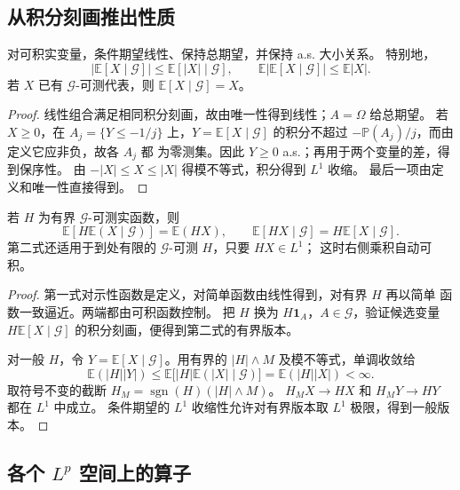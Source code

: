 \subsection{从积分刻画推出性质}

\begin{proposition}
\label{prop:conditional-basic-properties}
对可积实变量，条件期望线性、保持总期望，并保持 a.s. 大小关系。
特别地，
\[
 |\mathbb E[X\mid\mathcal G]|
 \le\mathbb E[|X|\mid\mathcal G],\qquad
 \mathbb E|\mathbb E[X\mid\mathcal G]|\le\mathbb E|X|.
\]
若 $X$ 已有 $\mathcal G$-可测代表，则
$\mathbb E[X\mid\mathcal G]=X$。
\end{proposition}

\begin{proof}
线性组合满足相同积分刻画，故由唯一性得到线性；$A=\Omega$ 给总期望。
若 $X\ge0$，在 $A_j=\{Y\le-1/j\}$ 上，$Y=\mathbb E[X\mid\mathcal G]$
的积分不超过 $-\mathbb P(A_j)/j$，而由定义它应非负，故各 $A_j$ 都
为零测集。因此 $Y\ge0$ a.s.；再用于两个变量的差，得到保序性。
由 $-|X|\le X\le|X|$ 得模不等式，积分得到 $L^1$ 收缩。
最后一项由定义和唯一性直接得到。
\end{proof}

\begin{proposition}[可测因子提出]
\label{prop:conditional-pullout}
若 $H$ 为有界 $\mathcal G$-可测实函数，则
\[
 \mathbb E[H\mathbb E(X\mid\mathcal G)]=\mathbb E(HX),\qquad
 \mathbb E[HX\mid\mathcal G]=H\mathbb E[X\mid\mathcal G].
\]
第二式还适用于到处有限的 $\mathcal G$-可测 $H$，只要 $HX\in L^1$；
这时右侧乘积自动可积。
\end{proposition}

\begin{proof}
第一式对示性函数是定义，对简单函数由线性得到，对有界 $H$ 再以简单
函数一致逼近。两端都由可积函数控制。
把 $H$ 换为 $H\mathbf1_A$，$A\in\mathcal G$，验证候选变量
$H\mathbb E[X\mid\mathcal G]$ 的积分刻画，便得到第二式的有界版本。

对一般 $H$，令 $Y=\mathbb E[X\mid\mathcal G]$。用有界的 $|H|\wedge M$
及模不等式，单调收敛给
\[
 \mathbb E(|H||Y|)
 \le\mathbb E\bigl[|H|\mathbb E(|X|\mid\mathcal G)\bigr]
 =\mathbb E(|H||X|)<\infty.
\]
取符号不变的截断 $H_M=\operatorname{sgn}(H)(|H|\wedge M)$。
$H_MX\to HX$ 和 $H_MY\to HY$ 都在 $L^1$ 中成立。
条件期望的 $L^1$ 收缩性允许对有界版本取 $L^1$ 极限，得到一般版本。
\end{proof}

\subsection{各个 \texorpdfstring{$L^p$}{Lp} 空间上的算子}

